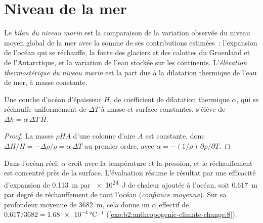 \section{Niveau de la mer}\label{sec:b2:anthropogenic-climate-change:sea-level}

\begin{definition}\label{def:b2:anthropogenic-climate-change:sea-level}
Le \emph{bilan du niveau marin} est la comparaison de la variation observée du
niveau moyen global de la mer avec la somme de ses contributions estimées~: l'expansion de l'océan qui se
réchauffe, la fonte des glaciers et des calottes du Groenland et de l'Antarctique, et la variation de l'eau
stockée sur les continents. L'\emph{élévation thermostérique du niveau marin}
est la part due à la dilatation thermique de l'eau de mer, à masse constante.
\end{definition}

\begin{proposition}\label{prop:b2:anthropogenic-climate-change:thermosteric}
Une couche d'océan d'épaisseur $H$, de coefficient de dilatation thermique $\alpha$, qui se réchauffe
uniformément de $\Delta T$ à masse et surface constantes, s'élève de $\Delta h = \alpha\,\Delta T\,H$.
\end{proposition}
\begin{proof}
La masse $\rho H A$ d'une colonne d'aire $A$ est constante, donc $\Delta H/H = -\Delta\rho/\rho =
\alpha\,\Delta T$ au premier ordre, avec $\alpha = -(1/\rho)\,\partial\rho/\partial T$.
\end{proof}

Dans l'océan réel, $\alpha$ croît avec la température et la pression, et le réchauffement est concentré
près de la surface. L'évaluation résume le résultat par une efficacité d'expansion de \qty{0.113}{m}
par \qty{e24}{J} de chaleur ajoutée à l'océan, soit \qty{0.617}{m} par degré de réchauffement de tout
l'océan (\emph{confiance moyenne}). Sur sa profondeur moyenne de \qty{3682}{m}, cela donne un $\alpha$
effectif de $0.617/3682 = \qty{1.68e-4}{\celsius^{-1}}$ (\cref{exo:b2:anthropogenic-climate-change:8}).

